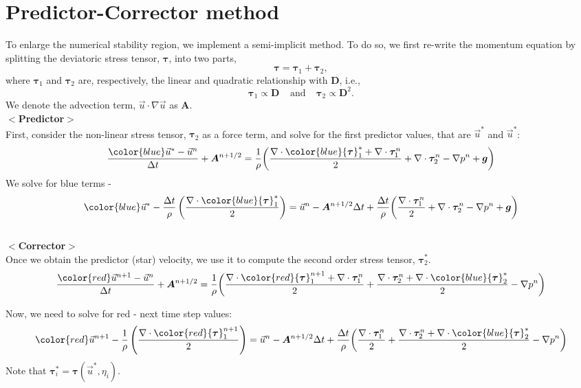 \section{Predictor-Corrector method}
To enlarge the numerical stability region, we implement a semi-implicit method. To do so, we first re-write the momentum equation by splitting the deviatoric stress tensor, ${\bm \tau}$, into two parts, 
\[
 {\bm \tau}= {\bm \tau_1} + {\bm \tau_2},
\] 
where ${\bm \tau_1}$ and ${\bm \tau_2}$ are, respectively, the linear and quadratic relationship with ${\bm D}$, i.e., 
\[
  {\boldsymbol \tau_1} \propto \boldsymbol{D}
  \ \ \ \ \ \text{and}
   \ \ \ \ \ 
{\boldsymbol \tau_2} \propto {\boldsymbol D^2}.
\]
We denote the advection term, $\vec{u} \cdot \nabla \vec{u}$ as ${\bm A}$. 
\\
$<${\bf Predictor}$>$
\\
First, consider the non-linear stress tensor, ${\bm \tau_2}$ as a force term, and solve for the first predictor values, that are $\vec{u}^*$ and $\vec{u}^*$:
\[
\frac{{\color{blue}\vec{u}^*} - \vec{u}^n}{\Delta t} 
+  {\bm A}^{n+1/2} 
= \frac{1}{\rho}  \biggl(
\frac{\nabla \cdot {\color{blue}{\bm \tau}_1^*} + \nabla \cdot{\bm \tau}_1^n}{2} 
+ \nabla \cdot {\bm \tau}_2^n 
- \nabla p^n
+{\bm g}
\biggr)
\]
We solve for blue terms - 
\[
{\color{blue}\vec{u}^*} -
\frac{\Delta t}{\rho} 
\left( 
\frac{\nabla \cdot {\color{blue}{\bm \tau}_1^*}}{2}
\right)
=
\vec{u}^n
- {\bm A}^{n+1/2} \Delta t
+ \frac{\Delta t}{\rho} \biggl(
\frac{ \nabla \cdot{\bm \tau}_1^n}{2} 
+ \nabla \cdot {\bm \tau}_2^n 
- \nabla p^n
+{\bm g}
\biggr)
\]
\\
$<${\bf Corrector}$>$
\\
Once we obtain the predictor (star) velocity, we use it to compute the second order stress tensor, ${\bm \tau}_2^*$.
\[
\frac{{\color{red}\vec{u}^{n+1}} - \vec{u}^n}{\Delta t} 
+  {\bm A}^{n+1/2} 
=  \frac{1}{\rho}  \biggl(
\frac{\nabla \cdot {\color{red}{\bm \tau}_1^{n+1}} + \nabla \cdot{\bm \tau}_1^n}{2} 
+ \frac{\nabla \cdot {\bm \tau}_2^{n} + \nabla \cdot {\color{blue}{\bm \tau}_2^*}}{2} 
- \nabla p^n
\biggr)
\]

Now, we need to solve for red - next time step values:
\[
{\color{red}\vec{u}^{n+1}} 
-\frac{1}{\rho} 
\left(
\frac{\nabla \cdot {\color{red}{\bm \tau}_1^{n+1}}}{2}
\right)
=
\vec{u}^n 
 -{\bm A}^{n+1/2} \Delta t
 +\frac{\Delta t}{\rho}  \biggl(
\frac{ \nabla \cdot{\bm \tau}_1^n}{2} 
+ \frac{\nabla \cdot {\bm \tau}_2^{n} + \nabla \cdot {\color{blue}{\bm \tau}_2^*}}{2} 
- \nabla p^n
\biggr)
\]
Note that ${\bm \tau}_i^* = {\bm \tau}(\vec{u}^*, \eta_i)$.




